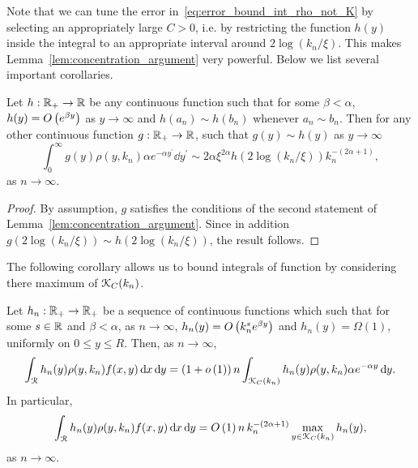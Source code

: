 Note that we can tune the error in~\eqref{eq:error_bound_int_rho_not_K} by selecting an appropriately large $C > 0$, i.e. by restricting the function $h(y)$ inside the integral to an appropriate interval around $2\log(k_n/\xi)$. This makes Lemma~\ref{lem:concentration_argument} very powerful. Below we list several important corollaries. 

\begin{corollary}\label{cor:concentration_of_heights_asymptotics}
Let $h : {\mathbb R}_+ \to {\ensuremath{\mathbb R}}$ be any continuous function such that for some $\beta < \alpha$, $h(y) = O\left(e^{\beta y}\right)$ as $y \to \infty$ and $h(a_n) \sim h(b_n)$ whenever $a_n \sim b_n$. Then for any other continuous function $g: {\mathbb R}_+ \to {\ensuremath{\mathbb R}}$, such that $g(y) \sim h(y)$ as $y \to \infty$
\begin{equation}\label{eq:concentration_h_sim_rho}
	\int_0^\infty g(y) \rho(y,k_n) \alpha e^{-\alpha y^\prime} \dd y^\prime \sim  
		2\alpha \xi^{2\alpha} h(2\log(k_n/\xi)) k_n^{-(2\alpha + 1)},
\end{equation}
as $n \to \infty$.
\end{corollary}

\begin{proof}
By assumption, $g$ satisfies the conditions of the second statement of Lemma~\ref{lem:concentration_argument}. Since in addition $g(2\log(k_n/\xi)) \sim h(2\log(k_n/\xi))$, the result follows.
\end{proof}


The following corollary allows us to bound integrals of function by considering there maximum of ${\mathcal K}_{C}(k_n)$.

\begin{corollary}\label{cor:concentration_heights_bounds_n}
Let $h_n : {\mathbb R}_+ \to {\ensuremath{\mathbb R}}_+$ be a sequence of continuous functions which such that for some $s \in {\ensuremath{\mathbb R}}$ and $\beta < \alpha$, as $n \to \infty$, $h_n(y) = O\left(k_n^{s} e^{\beta y}\right)$ and $h_n(y) = \Omega(1)$, uniformly on $0 \le y \le R$. Then, as $n \to \infty$,
\[
	\int_{{\mathcal R}} h_n(y) \rho(y,k_n) f(x,y) \operatorname{\mathrm{d}\hspace{-2pt}} x \operatorname{\mathrm{d}\hspace{-2pt}} y 
	= (1 + o\left(1\right)) \, n \int_{{\mathcal K}_{C}(k_n)} h_n(y) \rho(y,k_n) \alpha e^{-\alpha y} \operatorname{\mathrm{d}\hspace{-2pt}} y.
\]
In particular,
\[
	\int_{{\mathcal R}} h_n(y) \rho(y,k_n) f(x,y) \operatorname{\mathrm{d}\hspace{-2pt}} x \operatorname{\mathrm{d}\hspace{-2pt}} y = O\left(1\right) n \, k_n^{-(2\alpha + 1)} \max_{y \in {\mathcal K}_{C}(k_n)} h_n(y),
\]
as $n \to \infty$.
\end{corollary}

